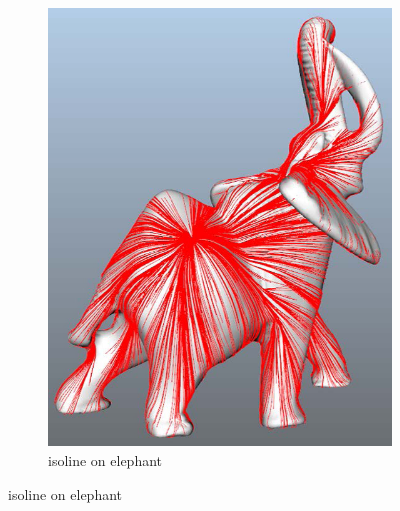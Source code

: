 \begin{figure}
\begin{subfigure}[b]{0.5\textwidth}
                \includegraphics[width=\textwidth]{../images/geodesic_image/elephant-1}
                \caption{isoline on elephant}
                \label{fig:elephant}
        \end{subfigure}        
\end{figure}


